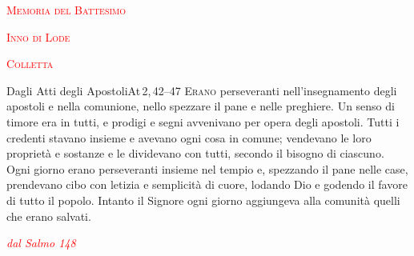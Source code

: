 \documentclass[11pt]{book}
\renewcommand{\intestfont}[1]{{\Large\scshape\textcolor{red}{#1}}}
\newcommand{\sottomomento}[1]{{\intestfont{#1}}\par\medskip}
\begin{document}
\segnocroce

\newpage
\sottomomento{Memoria del Battesimo}
\introduzione

\membatt
\newpage
\sottomomento{Inno di Lode}
\gloria
\sottomomento{Colletta}
\colletta
\newpage
{}
\begin{lettura}[Prima]{Dagli Atti degli Apostoli}{At\,2,\,42--47}
\lettrine[lines=3]{E}{rano} perseveranti nell'insegnamento degli apostoli e nella comunione, nello spezzare il pane e nelle preghiere. Un senso di timore era in tutti, e prodigi e segni avvenivano per opera degli apostoli. Tutti i credenti stavano insieme e avevano ogni cosa in comune; vendevano le loro proprietà e sostanze e le dividevano con tutti, secondo il bisogno di ciascuno. Ogni giorno erano perseveranti insieme nel tempio e, spezzando il pane nelle case, prendevano cibo con letizia e semplicità di cuore, lodando Dio e godendo il favore di tutto il popolo. Intanto il Signore ogni giorno aggiungeva alla comunità quelli che erano salvati.
\end{lettura}

\newpage%
\renewcommand{\versettosalmo}{Lodiamo insieme il nome del Signore}
\noindent\intestfont{Salmo responsoriale}\hfil {\small\itshape\textcolor{red}{dal Salmo 148}}

\medskip\nobreak
\noindent\rispostasalmo
\end{document}
